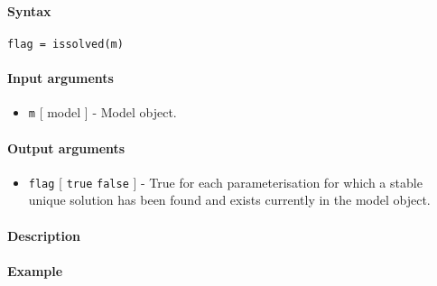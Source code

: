 


	\paragraph{Syntax}\label{syntax}

\begin{verbatim}
flag = issolved(m)
\end{verbatim}

\paragraph{Input arguments}\label{input-arguments}

\begin{itemize}
\itemsep1pt\parskip0pt
\item
  \texttt{m} {[} model {]} - Model object.
\end{itemize}

\paragraph{Output arguments}\label{output-arguments}

\begin{itemize}
\itemsep1pt\parskip0pt
\item
  \texttt{flag} {[} \texttt{true} \textbar{} \texttt{false} {]} - True
  for each parameterisation for which a stable unique solution has been
  found and exists currently in the model object.
\end{itemize}

\paragraph{Description}\label{description}

\paragraph{Example}\label{example}


